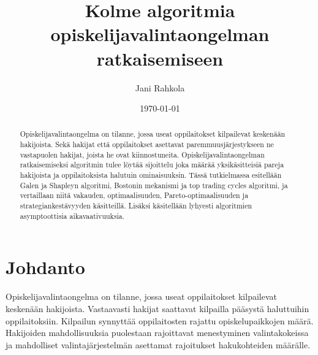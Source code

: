 \documentclass[twoside]{tktltiki}
\begin{document}
\title{Kolme algoritmia opiskelijavalintaongelman ratkaisemiseen}
\author{Jani Rahkola}
\date{\today}



\maketitle

\doublespacing

\subject{Tietojenkäsittelytiede}

\def\hyph{-\penalty0\hskip0pt\relax}
\hyphenation{}

\begin{abstract}
Opiskelijavalintaongelma on tilanne, jossa useat oppilaitokset
kilpailevat keskenään hakijoista. Sekä hakijat että oppilaitokset
asettavat paremmuusjärjestykseen ne vastapuolen hakijat, joista he
ovat kiinnostuneita. Opiskelijavalintaongelman ratkaisemiseksi
algoritmin tulee löytää sijoittelu joka määrää yksikäsitteisiä pareja
hakijoista ja oppilaitoksista halutuin ominaisuuksin. Tässä
tutkielmassa esitellään Galen ja Shapleyn algoritmi, Bostonin
mekanismi ja top trading cycles algoritmi, ja vertaillaan niitä
vakauden, optimaalisuuden, Pareto\hyph optimaalisuuden ja
strategiankestävyyden käsitteillä. Lisäksi käsitellään lyhyesti
algoritmien asymptoottisia aikavaativuuksia.
\end{abstract}

\mytableofcontents

\section{Johdanto}

Opiskelijavalintaongelma on tilanne, jossa useat oppilaitokset
kilpailevat keskenään hakijoista. Vastaavasti hakijat saattavat
kilpailla pääsystä haluttuihin oppilaitoksiin. Kilpailun synnyttää
oppilaitosten rajattu opiskelupaikkojen määrä. Hakijoiden
mahdollisuuksia puolestaan rajoittavat menestyminen valintakokeissa ja
mahdolliset valintajärjestelmän asettamat rajoitukset hakukohteiden
määrälle.
\end{document}
